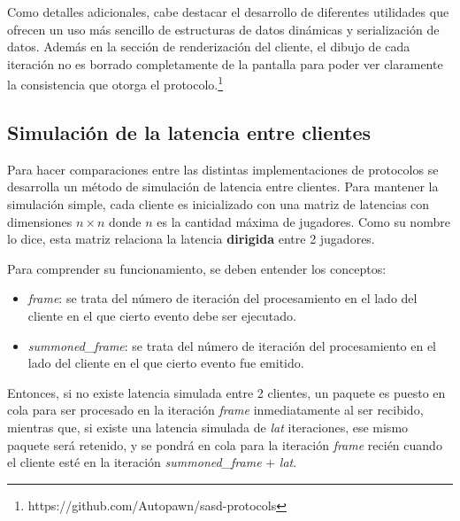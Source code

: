 Como detalles adicionales, cabe destacar el desarrollo de diferentes utilidades que ofrecen un uso más sencillo de estructuras de datos dinámicas y serialización de datos. Además en la sección de renderización del cliente, el dibujo de cada iteración no es borrado completamente de la pantalla para poder ver claramente la consistencia que otorga el protocolo.\footnote{https://github.com/Autopawn/sasd-protocols}

\subsection{Simulación de la latencia entre clientes}

Para hacer comparaciones entre las distintas implementaciones de protocolos se desarrolla un método de simulación de latencia entre clientes. Para mantener la simulación simple, cada cliente es inicializado con una matriz de latencias con dimensiones $n\times n$ donde $n$ es la cantidad máxima de jugadores. Como su nombre lo dice, esta matriz relaciona la latencia \textbf{dirigida} entre 2 jugadores.

Para comprender su funcionamiento, se deben entender los conceptos:
\begin{itemize}
	\item \emph{frame}: se trata del número de iteración del procesamiento en el lado del cliente en el que cierto evento debe ser ejecutado.
	\item \emph{summoned\_frame}: se trata del número de iteración del procesamiento en el lado del cliente en el que cierto evento fue emitido.
\end{itemize}

Entonces, si no existe latencia simulada entre 2 clientes, un paquete es puesto en cola para ser procesado en la iteración \emph{frame} inmediatamente al ser recibido, mientras que, si existe una latencia simulada de \emph{lat} iteraciones, ese mismo paquete será retenido, y se pondrá en cola para la iteración \emph{frame} recién cuando el cliente esté en la iteración \emph{summoned\_frame} + \emph{lat}.




